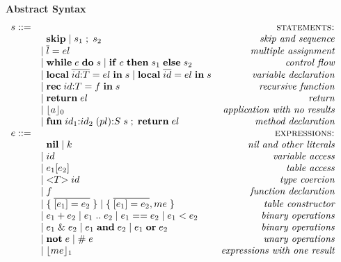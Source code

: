 \begin{figure}[!ht]
\textbf{Abstract Syntax}\\
\dstart
$$
\begin{array}{rlr}
s ::= & & \textsc{statements:}\\
& \;\; \mathbf{skip} \;
| \; s_{1} \; ; \; s_{2} & \textit{skip and sequence}\\
& | \; \overline{l} = el & \textit{multiple assignment}\\
& | \; \mathbf{while} \; e \; \mathbf{do} \; s \;
| \; \mathbf{if} \; e \; \mathbf{then} \; s_{1} \; \mathbf{else} \; s_{2} & \textit{control flow}\\
& | \; \mathbf{local} \; \overline{id{:}T} = el \; \mathbf{in} \; s \;
| \; \mathbf{local} \; \overline{id} = el \; \mathbf{in} \; s & \textit{variable declaration}\\
& | \; \mathbf{rec} \; id{:}T = f \; \mathbf{in} \; s & \textit{recursive function} \\
& | \; \mathbf{return} \; el & \textit{return} \\
& | \; \lfloor a \rfloor_{0} & \textit{application with no results}\\
& | \; \mathbf{fun} \; id_{1}{:}id_{2} \; (pl){:}S \; s \;;\; \mathbf{return} \; el & \textit{method declaration}\\
e ::= & & \textsc{expressions:}\\
& \;\; \mathbf{nil} \;
| \; k & \textit{nil and other literals}\\
& | \; id & \textit{variable access}\\
& | \; e_{1}[e_{2}] & \textit{table access}\\
& | \; {<}T{>} \; id & \textit{type coercion}\\
& | \; f & \textit{function declaration}\\
& | \; \{ \; \overline{[e_{1}] = e_{2}} \; \} \;
| \; \{ \; \overline{[e_{1}] = e_{2}},me \; \} & \textit{table constructor}\\
& | \; e_{1} + e_{2} \;
| \; e_{1} \; {..} \; e_{2} \;
| \; e_{1} == e_{2} \;
| \; e_{1} < e_{2} & \textit{binary operations}\\
& | \; e_{1} \;\&\; e_{2} \;
| \; e_{1} \; \mathbf{and} \; e_{2} \;
| \; e_{1} \; \mathbf{or} \; e_{2} & \textit{binary operations}\\
& | \; \mathbf{not} \; e \;
| \; \# \; e & \textit{unary operations} \\
& | \; \lfloor me \rfloor_{1} & \textit{expressions with one result}\\

\end{array}$$
\end{figure}
